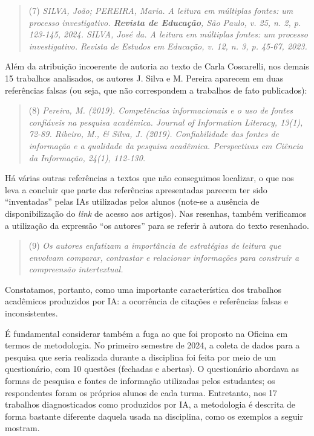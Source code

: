 \documentclass[portuguese]{textolivre}
\begin{document}
\begin{quote}
(7) \textit{SILVA, João; PEREIRA, Maria. A leitura em múltiplas fontes: um processo investigativo. \textbf{Revista de Educação}, São Paulo, v. 25, n. 2, p. 123-145, 2024. \newline
SILVA, José da. A leitura em múltiplas fontes: um processo investigativo. Revista de Estudos em Educação, v. 12, n. 3, p. 45-67, 2023.}
\end{quote}

Além da atribuição incoerente de autoria ao texto de Carla Coscarelli, nos demais 15 trabalhos analisados, os autores J. Silva e M. Pereira aparecem em duas referências falsas (ou seja, que não correspondem a trabalhos de fato publicados):

\begin{quote}
(8) \textit{Pereira, M. (2019). Competências informacionais e o uso de fontes confiáveis na pesquisa acadêmica. Journal of Information Literacy, 13(1), 72-89. \newline
Ribeiro, M., \& Silva, J. (2019). Confiabilidade das fontes de informação e a qualidade da pesquisa acadêmica. Perspectivas em Ciência da Informação, 24(1), 112-130.}
\end{quote}

Há várias outras referências a textos que não conseguimos localizar, o que nos leva a concluir que parte das referências apresentadas parecem ter sido ``inventadas'' pelas IAs utilizadas pelos alunos (note-se a ausência de disponibilização do \textit{link} de acesso aos artigos). Nas resenhas, também verificamos a utilização da expressão ``os autores'' para se referir à autora do texto resenhado.

\begin{quote}
(9) \textit{Os autores enfatizam a importância de estratégias de leitura que envolvam comparar, contrastar e relacionar informações para construir a compreensão intertextual.}
\end{quote}

Constatamos, portanto, como uma importante característica dos trabalhos acadêmicos produzidos por IA: a ocorrência de citações e referências falsas e inconsistentes.

É fundamental considerar também a fuga ao que foi proposto na Oficina em termos de metodologia. No primeiro semestre de 2024, a coleta de dados para a pesquisa que seria realizada durante a disciplina foi feita por meio de um questionário, com 10 questões (fechadas e abertas). O questionário abordava as formas de pesquisa e fontes de informação utilizadas pelos estudantes; os respondentes foram os próprios alunos de cada turma. Entretanto, nos 17 trabalhos diagnosticados como produzidos por IA, a metodologia é descrita de forma bastante diferente daquela usada na disciplina, como os exemplos a seguir mostram.
\end{document}
